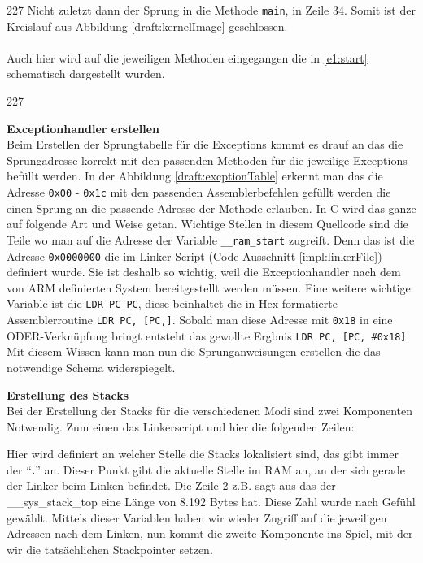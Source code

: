 \begin{dinglist}{227}
Nicht zuletzt dann der Sprung in die Methode \texttt{main}, in Zeile 34. Somit ist der Kreislauf aus Abbildung \ref{draft:kernelImage} geschlossen.\\ \\
Auch hier wird auf die jeweiligen Methoden eingegangen die in 
\ref{e1:start} schematisch dargestellt wurden.
\begin{dinglist}{227}
	\item{\textbf{Exceptionhandler erstellen}}\\
	Beim Erstellen der Sprungtabelle f\"ur die Exceptions kommt es drauf an das die Sprungadresse korrekt mit den passenden Methoden f\"ur die jeweilige Exceptions bef\"ullt werden. In der Abbildung \ref{draft:excptionTable} erkennt man das die Adresse \texttt{0x00} - \texttt{0x1c} mit den passenden Assemblerbefehlen gef\"ullt werden die einen Sprung an die passende Adresse der Methode erlauben. In C wird das ganze auf folgende Art und Weise getan.	
Wichtige Stellen in diesem Quellcode sind die Teile wo man auf die Adresse der Variable \texttt{\_\_ram\_start} zugreift. Denn das ist die Adresse \texttt{0x0000000} die im Linker-Script (Code-Ausschnitt \ref{impl:linkerFile}) definiert wurde. Sie ist deshalb so wichtig, weil die Exceptionhandler nach dem von ARM definierten System bereitgestellt werden m\"ussen. Eine weitere wichtige Variable ist die \texttt{LDR\_PC\_PC}, diese beinhaltet die in Hex formatierte Assemblerroutine \texttt{LDR PC, [PC,]}. Sobald man diese Adresse mit \texttt{0x18} in eine ODER-Verkn\"upfung bringt entsteht das gewollte Ergbnis \texttt{LDR PC, [PC, \#0x18]}.
Mit diesem Wissen kann man nun die Sprunganweisungen erstellen die das notwendige Schema widerspiegelt.

	\item{\textbf{Erstellung des Stacks}}\\
	Bei der Erstellung der Stacks f\"ur die verschiedenen Modi sind zwei Komponenten Notwendig. Zum einen das Linkerscript und hier die folgenden Zeilen:
	
	Hier wird definiert an welcher Stelle die Stacks lokalisiert sind, das gibt immer der ``\textbf{.}'' an. Dieser Punkt gibt die aktuelle Stelle im RAM an, an der sich gerade der Linker beim Linken befindet. Die Zeile 2 z.B. sagt aus das der \_\_sys\_stack\_top eine L\"ange von 8.192 Bytes hat. Diese Zahl wurde nach Gef\"uhl gew\"ahlt. Mittels dieser Variablen haben wir wieder Zugriff auf die jeweiligen Adressen nach dem Linken, nun kommt die zweite Komponente ins Spiel, mit der wir die tats\"achlichen Stackpointer setzen.	

\end{dinglist}
\end{dinglist}
